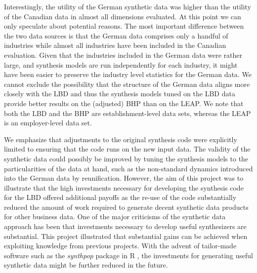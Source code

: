 \documentclass[10pt]{article}
\begin{document}
Interestingly, the utility of the German synthetic data was higher than the utility of the Canadian data in almost all dimensions evaluated. At this point we can only speculate about potential reasons. The most important difference between the two data sources is that the German data comprises only a handful of industries while almost all industries have been included in the Canadian evaluation. Given that the industries included in the German data were rather large, and synthesis models are run independently for each industry, it might have been easier to preserve the industry level statistics for the German data. We cannot exclude the possibility that  the structure of the German data aligns more closely with the LBD and thus the synthesis models tuned on the LBD data provide better results on the (adjusted) BHP than on the LEAP. We note that both the LBD and the BHP are establishment-level data sets, whereas the LEAP is an employer-level data set. 

We emphasize that adjustments to the original synthesis code were explicitly limited to ensuring that the code runs on the new input data. The validity of the synthetic data could possibly be improved by tuning the synthesis models to the particularities of the data at hand, such as the non-standard dynamics introduced into the German data by reunification.  However, the aim of this project was to illustrate that the high investments necessary for developing the synthesis code for the LBD offered additional payoffs as the re-use of the code substantially reduced the amount of work required to generate decent synthetic data products for other business data. One of the major criticisms of the synthetic data approach has been  that investments necessary to develop useful synthesizers are substantial. This project illustrated that substantial gains can be achieved when exploiting knowledge from previous projects. With the advent of tailor-made software such as the \textit{synthpop} package in R \citep{JSSv074i11}, the investments for generating useful synthetic data might be further reduced in the future.
\end{document}
